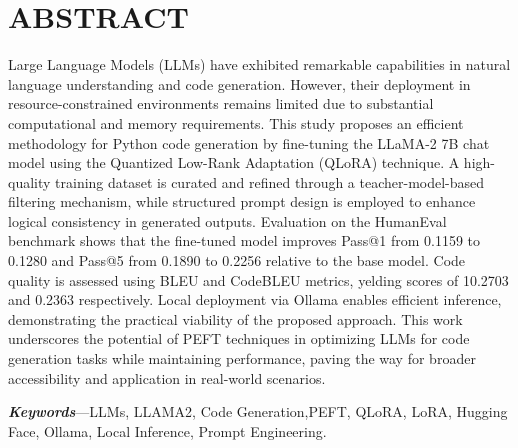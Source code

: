 


\chapter*{ABSTRACT}
{}


\bigskip

Large Language Models (LLMs) have exhibited remarkable capabilities in natural language understanding and code generation. However, their deployment in resource-constrained environments remains limited due to substantial computational and memory requirements. This study proposes an efficient methodology for Python code generation by fine-tuning the LLaMA-2 7B chat model using the Quantized Low-Rank Adaptation (QLoRA) technique. A high-quality training dataset is curated and refined through a teacher-model-based filtering mechanism, while structured prompt design is employed to enhance logical consistency in generated outputs. Evaluation on the HumanEval benchmark shows that the fine-tuned model improves Pass@1 from 0.1159 to 0.1280 and Pass@5 from 0.1890 to 0.2256 relative to the base model. Code quality is assessed using BLEU and CodeBLEU metrics, yelding scores of 10.2703 and 0.2363 respectively. Local deployment via Ollama enables efficient inference, demonstrating the practical viability of the proposed approach. This work underscores the potential of PEFT techniques in optimizing LLMs for code generation tasks while maintaining performance, paving the way for broader accessibility and application in real-world scenarios.
\vspace{1em}

\noindent\textit{\textbf{Keywords}}---LLMs, LLAMA2, Code Generation,PEFT, QLoRA, LoRA, Hugging Face, Ollama, Local Inference, Prompt Engineering.

